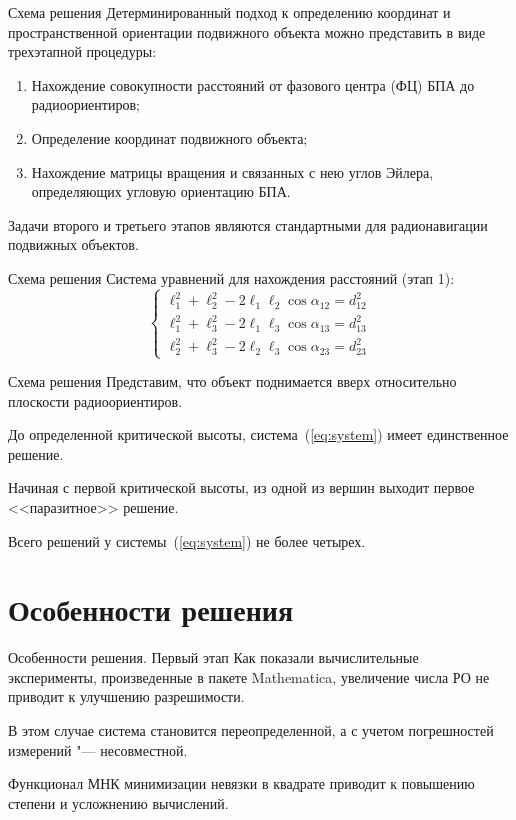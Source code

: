 \documentclass[russian,hyperref={unicode}]{beamer}
\begin{document}
  \begin{frame}{Схема решения}
    Детерминированный подход к определению координат и пространственной ориентации подвижного объекта можно представить
    в виде трехэтапной процедуры:
    \begin{enumerate}
        \item Нахождение совокупности расстояний от фазового центра (ФЦ) БПА до радиоориентиров;
        \item Определение координат подвижного объекта;
        \item Нахождение матрицы вращения и связанных с нею углов Эйлера, определяющих угловую ориентацию БПА.
    \end{enumerate}
    Задачи второго и третьего этапов являются стандартными для радионавигации подвижных объектов.
  \end{frame}

  \begin{frame}{Схема решения}
    Система уравнений для нахождения расстояний (этап 1):
    \begin{equation} \label{eq:system}
      \begin{cases}
        \ell_1^2 + \ell_2^2 - 2 \ell_1 \ell_2 \cos\alpha_{12} = d_{12}^2 \\
        \ell_1^2 + \ell_3^2 - 2 \ell_1 \ell_3 \cos\alpha_{13} = d_{13}^2 \\
        \ell_2^2 + \ell_3^2 - 2 \ell_2 \ell_3 \cos\alpha_{23} = d_{23}^2
      \end{cases}
    \end{equation}
  \end{frame}

  \begin{frame}{Схема решения}
    Представим, что объект поднимается вверх относительно плоскости радиоориентиров.

    До определенной критической высоты, система~(\ref{eq:system}) имеет единственное решение.

    Начиная с первой критической высоты, из одной из вершин выходит первое <<паразитное>>
    решение.

    Всего решений у системы~(\ref{eq:system}) не более четырех.
  \end{frame}

  \section{Особенности решения}
  \begin{frame}{Особенности решения. Первый этап}
    Как показали вычислительные эксперименты, произведенные в пакете Mathematica,
    увеличение числа РО не приводит к улучшению разрешимости.

    В этом случае система становится переопределенной, а с учетом погрешностей измерений "---
    несовместной.

    Функционал МНК минимизации невязки в квадрате приводит к повышению степени и усложнению
    вычислений.
  \end{frame}
\end{document}
